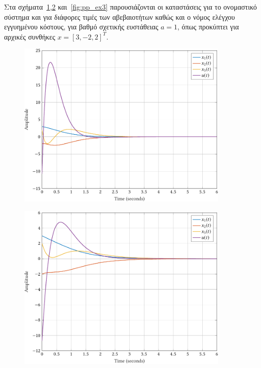 Στα σχήματα~\ref{fig:pp_ex1},\ref{fig:pp_ex2} και~\ref{fig:pp_ex3}
παρουσιάζονται οι καταστάσεις για το ονομαστικό σύστημα και για διάφορες τιμές
των αβεβαιοτήτων καθώς και ο νόμος ελέγχου εγγυημένου κόστους, για βαθμό
σχετικής ευστάθειας \( a = 1 \), όπως προκύπτει για αρχικές συνθήκες \( x = [3,
-2, 2]^T \).
\begin{figure}[h]
    \centering
    \includegraphics[width=0.9\textwidth]{figures/pp_ex1.pdf}
    \label{fig:pp_ex1}
\end{figure}
\begin{figure}[h]
    \centering
    \includegraphics[width=0.9\textwidth]{figures/pp_ex2.pdf}
    \label{fig:pp_ex2}
\end{figure}
